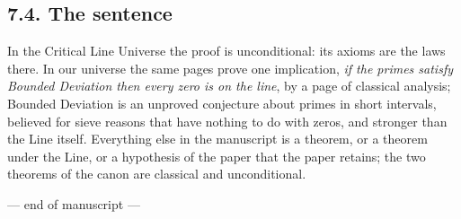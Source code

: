 \documentclass[11pt]{article}
\theoremstyle{definition}
\theoremstyle{remark}
\begin{document}
\subsection*{7.4. The sentence}

In the Critical Line Universe the proof is unconditional: its axioms are the laws there. In our universe the same pages prove one implication, \emph{if the primes satisfy Bounded Deviation then every zero is on the line}, by a page of classical analysis; Bounded Deviation is an unproved conjecture about primes in short intervals, believed for sieve reasons that have nothing to do with zeros, and stronger than the Line itself. Everything else in the manuscript is a theorem, or a theorem under the Line, or a hypothesis of the paper that the paper retains; the two theorems of the canon are classical and unconditional.

\bigskip
\begin{center}--- end of manuscript ---\end{center}
\end{document}
